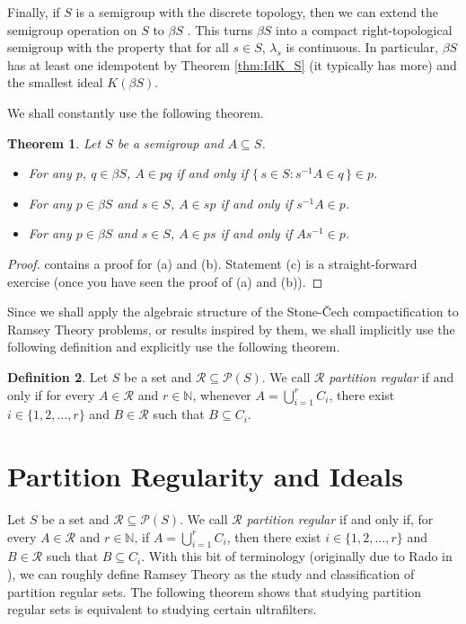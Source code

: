 \documentclass[12pt]{article}
\theoremstyle{plain}
\newtheorem{thm}{Theorem}[section]
\theoremstyle{definition}
\newtheorem{defn}[thm]{Definition}
\newcommand{\bbN}{\mathbb{N}}
\newcommand{\calP}{\mathcal{P}}
\newcommand{\calR}{\mathcal{R}}
\begin{document}
Finally, if $S$ is a semigroup with the discrete topology, then we can
extend the semigroup operation on $S$ to $\beta S$ \cite[Theorem
4.1]{Hindman:1998fk}.
This turns $\beta S$ into a compact right-topological semigroup with
the property that for all $s \in S$, $\lambda_s$ is continuous. 
In particular, $\beta S$ has at least one idempotent by Theorem
\ref{thm:IdK_S} (it typically has more) and the smallest ideal
$K(\beta S)$.

We shall constantly use the following theorem.
\begin{thm}
  Let $S$ be a semigroup and $A \subseteq S$.
  \begin{itemize}
    \item[(a)] For any $p$, $q \in \beta S$, $A \in pq$ if and only if
      $\{\, s \in S : s^{-1}A \in q \,\} \in p$. 
    
    \item[(b)] For any $p \in \beta S$ and $s \in S$, $A \in sp$ if
      and only if $s^{-1}A \in p$.

    \item[(c)] For any $p \in \beta S$ and $s \in S$, $A \in ps$ if
      and only if $As^{-1} \in p$.
  \end{itemize}
\end{thm}
\begin{proof}
  \cite[Theorem 4.12]{Hindman:1998fk} contains a proof for (a) and
  (b).
  Statement (c) is a straight-forward exercise (once you have seen the
  proof of (a) and (b)).
\end{proof}

Since we shall apply the algebraic structure of the Stone-\v{C}ech
compactification to Ramsey Theory problems, or results inspired by
them, we shall implicitly use the following definition and explicitly
use the following theorem. 

\begin{defn}
  Let $S$ be a set and $\calR \subseteq \calP(S)$.
  We call $\calR$ \textsl{partition regular} if and only if for every
  $A \in \calR$ and $r \in \bbN$, whenever $A = \bigcup_{i=1}^r C_i$,
  there exist $i \in \{1, 2, \ldots, r\}$ and $B \in \calR$ such that
  $B \subseteq C_i$.
\end{defn}


\section{Partition Regularity and Ideals}

Let $S$ be a set and $\calR \subseteq \calP(S)$.
We call $\calR$ \textsl{partition regular} if and only if, for every
$A \in \calR$ and $r \in \bbN$, if $A = \bigcup_{i=1}^r C_i$, then there
exist $i \in \{1, 2, \ldots, r\}$ and $B \in \calR$ such that $B
\subseteq C_i$.
With this bit of terminology (originally due to Rado in
\cite{Rado:1945kx}), we can roughly define Ramsey Theory as the
  study and classification of partition regular sets. 
The following theorem shows that studying partition regular sets is
equivalent to studying certain ultrafilters.
\end{document}
